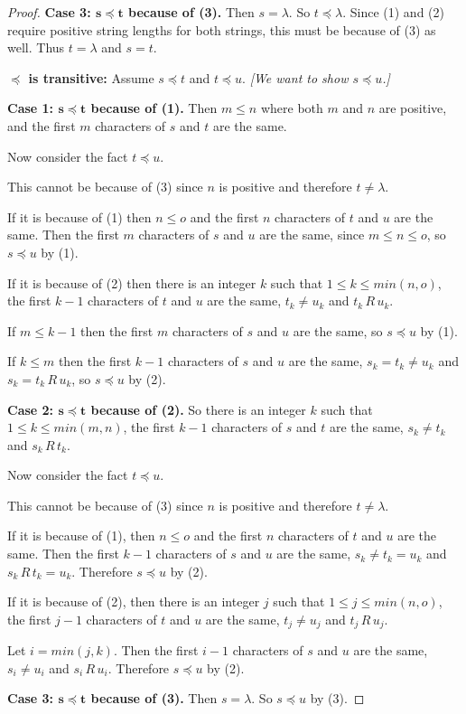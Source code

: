 \documentclass[14pt]{extarticle}
\begin{document}
\begin{proof}
{\bf Case 3: \(\bm{s \preceq t}\) because of (3).} Then \(s = \lambda\). So \(t \preceq \lambda\). Since (1) and (2)
require positive string lengths for both strings, this must be because of (3) as well. Thus \(t=\lambda\) and \(s=t\).

{\bf \(\bm{\preceq}\) is transitive:} Assume \(s\preceq t\) and \(t\preceq u\). {\it[We want to show \(s\preceq u\).]}

{\bf Case 1: \(\bm{s \preceq t}\) because of (1).} Then \(m \leq n\) where both $m$ and $n$ are positive, and the first 
$m$ characters of $s$ and $t$ are the same. 

Now consider the fact \(t \preceq u\). 

This cannot be because of (3) since $n$ is positive and therefore \(t \neq \lambda\). 

If it is because of (1) then \(n \leq o\) and the first $n$ characters of $t$ and $u$ are the same. Then the first $m$
characters of $s$ and $u$ are the same, since \(m \leq n \leq o\), so \(s \preceq u\) by (1).

If it is because of (2) then there is an integer $k$ such that \(1 \leq k \leq min(n,o)\), the first $k-1$ characters 
of $t$ and $u$ are the same, \(t_k \neq u_k\) and \(t_k \,R\, u_k\).

If \(m \leq k-1\) then the first $m$ characters of $s$ and $u$ are the same, so \(s \preceq u\) by (1).

If \(k \leq m\) then the first $k-1$ characters of $s$ and $u$ are the same, \(s_k = t_k \neq u_k\) and \(s_k = t_k \,R\, u_k\), so \(s \preceq u\) by (2).

{\bf Case 2: \(\bm{s \preceq t}\) because of (2).} So there is an integer $k$ such that \(1 \leq k \leq min(m,n)\), the 
first $k-1$ characters of $s$ and $t$ are the same, \(s_k \neq t_k\) and \(s_k \,R\, t_k\). 

Now consider the fact \(t \preceq u\). 

This cannot be because of (3) since $n$ is positive and therefore \(t \neq \lambda\). 

If it is because of (1), then \(n \leq o\) and the first $n$ characters of $t$ and $u$ are the same. Then the first
$k-1$ characters of $s$ and $u$ are the same, \(s_k \neq t_k = u_k\) and \(s_k \,R\, t_k = u_k\). Therefore 
\(s \preceq u\) by (2).

If it is because of (2), then there is an integer $j$ such that \(1 \leq j \leq min(n, o)\), the first $j-1$ 
characters of $t$ and $u$ are the same, \(t_j \neq u_j\) and \(t_j \,R\, u_j\).

Let \(i = min(j,k)\). Then the first $i-1$ characters of $s$ and $u$ are the same, \(s_i \neq u_i\) and \(s_i \,R\,
u_i\). Therefore \(s \preceq u\) by (2).

{\bf Case 3: \(\bm{s \preceq t}\) because of (3).} Then \(s = \lambda\). So \(s \preceq u\) by (3).
\end{proof}
\end{document}
